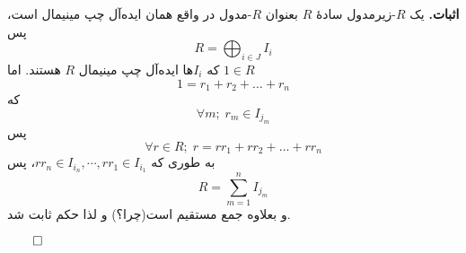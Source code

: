 \begin{frame}
    \textbf{اثبات.} یک \( R \)-زیرمدول سادهٔ \( R \) بعنوان \( R \)-مدول در واقع
    همان
    ایده‌آل چپ مینیمال است، پس
    \[
        R = \bigoplus_{i \in J} I_i
    \]
    که \( I_i \)ها ایده‌آل چپ مینیمال \( R \) هستند. اما \( 1 \in R \)
    \[
        1 = r_1 + r_2 + \dots + r_n
    \]
    که
    \[
        \forall m ; \; r_m \in I_{j_m}
    \]
    پس
    \[
        \forall r \in R ; \; r = r r_1 + r r_2 + \dots + r r_n
    \]
    به‌ طوری که
    \(rr_n \in I_{i_n}, \cdots, rr_1 \in I_{i_1}\)،
    پس
    \[
        R = \sum_{m=1}^n I_{j_m}
    \]
    و بعلاوه جمع مستقیم است(چرا؟)
    و لذا حکم ثابت شد.


    \hfill 
    \(\qed\)
\end{frame}